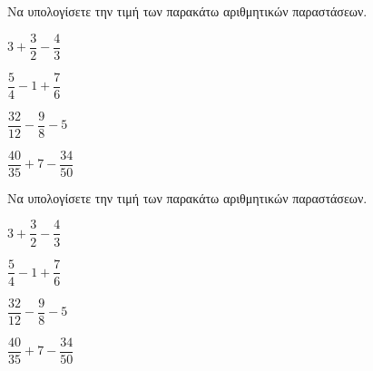 Να υπολογίσετε την τιμή των παρακάτω αριθμητικών παραστάσεων.
\begin{multicols}{2}
\begin{rlist}
\item $ 3+\dfrac{3}{2}-\dfrac{4}{3} $
\item $ \dfrac{5}{4}-1+\dfrac{7}{6} $
\item $ \dfrac{32}{12}-\dfrac{9}{8}-5 $
\item $ \dfrac{40}{35}+7-\dfrac{34}{50} $
\end{rlist}
\end{multicols}
Να υπολογίσετε την τιμή των παρακάτω αριθμητικών παραστάσεων.
\begin{multicols}{2}
\begin{rlist}
\item $ 3+\dfrac{3}{2}-\dfrac{4}{3} $
\item $ \dfrac{5}{4}-1+\dfrac{7}{6} $
\item $ \dfrac{32}{12}-\dfrac{9}{8}-5 $
\item $ \dfrac{40}{35}+7-\dfrac{34}{50} $
\end{rlist}
\end{multicols}
